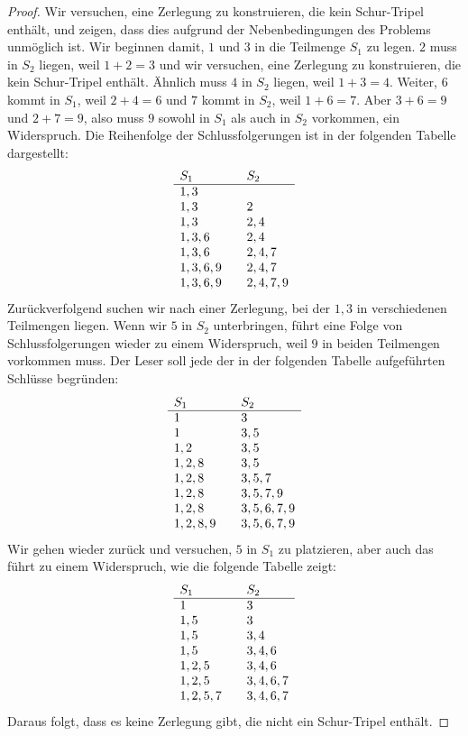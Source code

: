 \begin{proof}
Wir versuchen, eine Zerlegung zu konstruieren, die kein Schur-Tripel enthält, und zeigen, dass dies aufgrund der Nebenbedingungen des Problems unmöglich ist. Wir beginnen damit, $1$ und $3$ in die Teilmenge $S_1$ zu legen. $2$ muss in $S_2$ liegen, weil $1+2=3$ und wir versuchen, eine Zerlegung zu konstruieren, die kein Schur-Tripel enthält. Ähnlich muss $4$ in $S_2$ liegen, weil $1+3=4$. Weiter, $6$ kommt in $S_1$, weil $2+4=6$ und $7$ kommt in $S_2$, weil $1+6=7$. Aber $3+6=9$ und $2+7=9$, also muss $9$ sowohl in $S_1$ als auch in $S_2$ vorkommen, ein Widerspruch. Die Reihenfolge der Schlussfolgerungen ist in der folgenden Tabelle dargestellt:
\[
\begin{array}{l@{\hspace{2em}}l}
S_1&S_2\\\hline
1,3 & \\
1,3 & 2\\
1,3 & 2,4\\
1,3,6 & 2,4\\
1,3,6 & 2,4,7\\
1,3,6,9 & 2,4,7\\
1,3,6,9 & 2,4,7,9
\end{array}
\]
Zurückverfolgend suchen wir nach einer Zerlegung, bei der $1,3$ in verschiedenen Teilmengen liegen. Wenn wir $5$ in $S_2$ unterbringen, führt eine Folge von Schlussfolgerungen wieder zu einem Widerspruch, weil $9$ in beiden Teilmengen vorkommen muss. Der Leser soll jede der in der folgenden Tabelle aufgeführten Schlüsse begründen:
\[
\begin{array}{l@{\hspace{2em}}l}
S_1&S_2\\\hline
1&3\\
1 & 3,5\\
1,2&3,5\\
1,2,8&3,5\\
1,2,8&3,5,7\\
1,2,8&3,5,7,9\\
1,2,8&3,5,6,7,9\\
1,2,8,9&3,5,6,7,9
\end{array}
\]
Wir gehen wieder zurück und versuchen, $5$ in $S_1$ zu platzieren, aber auch das führt zu einem Widerspruch, wie die folgende Tabelle zeigt:
\[
\begin{array}{l@{\hspace{2em}}l}
S_1&S_2\\\hline
1&3\\
1,5& 3\\
1,5&3,4\\
1,5&3,4,6\\
1,2,5&3,4,6\\
1,2,5&3,4,6,7\\
1,2,5,7&3,4,6,7
\end{array}
\]
Daraus folgt, dass es keine Zerlegung gibt, die nicht ein Schur-Tripel enthält.
\end{proof}
